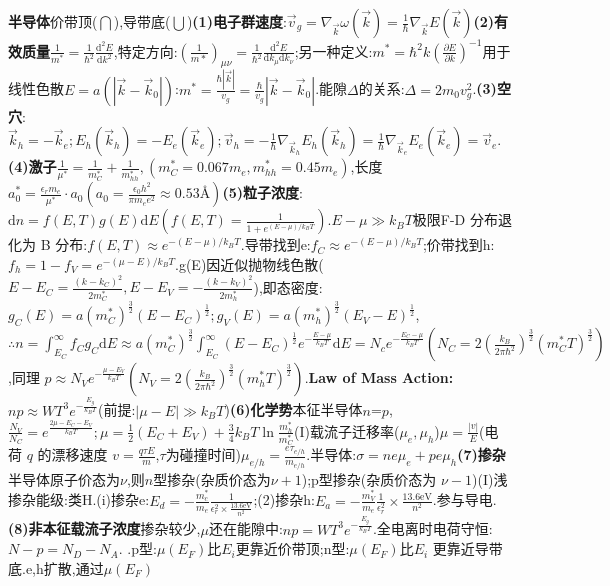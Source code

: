 \documentclass[UTF8,a4paper,10pt,twocolumn]{ctexart}
\begin{document}
   \textbf{半导体}价带顶($\bigcap$),导带底($\bigcup$)\textbf{(1)电子群速度}:$\vec{v}_{g} = \nabla_{\vec{k}}\omega(\vec{k})= \frac{1}{\hbar}\nabla_{\vec{k}}E(\vec{k})$\textbf{(2)有效质量}$\frac{1}{m^{*}} = \frac{1}{\hbar^{2}}\frac{\mathrm{d}^2 E}{\mathrm{d}k^2}$,特定方向:$\left(\frac{1}{m{*}}\right)_{\mu\nu}=\frac{1}{\hbar^{2}}\frac{\mathrm{d}^{2}E}{\mathrm{d}k_{\mu}\mathrm{d}k_{\nu}}$;另一种定义:$m^{*} = \hbar^{2}k\left(\frac{\partial E}{\partial k}\right)^{-1}$用于线性色散$E = a(|\vec{k}-\vec{k}_{0}|)$:$m^{*} = \frac{\hbar|\vec{k}|}{v_{g}} = \frac{\hbar}{v_{g}}|\vec{k}-\vec{k}_{0}|$.能隙$\Delta$的关系:$\Delta = 2m_{0}v_{g}^{2}$.\textbf{(3)空穴}:$\vec{k}_{h} = -\vec{k}_{e};E_{h}(\vec{k}_{h}) = - E_{e}(\vec{k}_{e});\vec{v}_{h} = -\frac{1}{\hbar}\nabla_{\vec{k}_{h}}E_{h}(\vec{k}_{h}) = \frac{1}{\hbar}\nabla_{\vec{k}_{e}}E_{e}(\vec{k}_{e}) = \vec{v}_{e}$.\textbf{(4)激子}$\frac{1}{\mu^{*}} = \frac{1}{m_{C}^{*}} + \frac{1}{m_{hh}^{*}},(m_{C}^{*} = 0.067m_{e},  m_{hh}^{*} = 0.45m_{e})$,长度$a_{0}^{*} = \frac{\epsilon_{r}m_{e}}{\mu^{*}}\cdot a_{0}(a_{0} = \frac{\epsilon_{0}h^{2}}{\pi m_{e}e^{2}} \approx 0.53\text{Å})$\textbf{(5)粒子浓度}:$\mathrm{d}n = f(E, T)g(E)\mathrm{d}E(f(E,T) = \frac{1}{1+e^{(E-\mu)/k_{B}T}})$.$E - \mu\gg k_{B}T$极限F-D 分布退化为 B 分布:$f(E, T) \approx e^{-(E-\mu)/k_{B}T}$.导带找到e:$f_{C}\approx e^{-(E-\mu)/k_{B}T}$;价带找到h:$f_{h} = 1 - f_{V}=e^{-(\mu-E)/k_{B}T}$.g(E)因近似抛物线色散($E - E_{C} = \frac{(k-k_{C})^{2}}{2m_{C}^{*}},E - E_{V} =-\frac{(k-k_{V})^{2}}{2m_{h}^{*}}$),即态密度:$g_{C}(E) = a(m_{C}^{*})^{\frac{3}{2}}(E - E_{C})^{\frac{1}{2}};g_{V}(E) = a(m_{h}^{*})^{\frac{3}{2}}(E_{V} - E)^{\frac{1}{2}}$,$\therefore n = \int_{E_{C}}^{\infty}f_{C}g_{C}\mathrm{d}E\approx a(m_{C}^{*})^{\frac{3}{2}}\int_{E_{C}}^{\infty}(E-E_{C})^{\frac{1}{2}}e^{-\frac{E-\mu}{k_{B}T}}\mathrm{d}E= N_{c} e^{-\frac{E_{C}-\mu}{k_{B}T}}(N_{C} = 2(\frac{k_{B}}{2\pi\hbar^{2}})^{\frac{3}{2}}(m_{C}^{*}T)^{\frac{3}{2}})$,同理 $p \approx N_{V}e^{-\frac{\mu - E_{V}}{k_{B}T}}(N_{V} = 2(\frac{k_{B}}{2\pi\hbar^{2}})^{\frac{3}{2}}(m_{h}^{*}T)^{\frac{3}{2}})$.\textbf{Law of Mass Action:}$np\approx WT^{3}e^{-\frac{E_{g}}{k_{B}T}}$(前提:$|\mu - E|\gg k_{B}T$)\textbf{(6)化学势}本征半导体$n$=$p$, $\frac{N_{V}}{N_{C}} = e^{\frac{2\mu-E_{C}-E_{V}}{k_{B}T}};\mu = \frac{1}{2}(E_{C}+ E_{V}) + \frac{3}{4}k_{B}T\ln{\frac{m_{h}^{*}}{m_{C}^{*}}}$(I)载流子迁移率($\mu_{e}, \mu_{h}$)$\mu = \frac{|v|}{E}$(电荷 $q$ 的漂移速度 $v =\frac{q\tau E}{m}$,$\tau$为碰撞时间)$\mu_{e/h} = \frac{e\tau_{e/h}}{m_{e/h}}$.半导体:$\sigma = ne\mu_e + pe\mu_h$\textbf{(7)掺杂}半导体原子价态为$\nu$,则$n$型掺杂(杂质价态为$\nu+1$);p型掺杂(杂质价态为 $\nu-1$)(I)浅掺杂能级:类H.(i)掺杂e:$E_{d}=-\frac{m_{c}^{*}}{m_{e}}\frac{1}{\epsilon_{r}^{2}\times\frac{13.6\text{eV}}{n^{2}}}$;(2)掺杂h:$E_{a}=-\frac{m_{V}^{*}}{m_{e}}\frac{1}{\epsilon_{r}^{2}}\times\frac{13.6\text{eV}}{n^{2}}$.参与导电.\textbf{(8)非本征载流子浓度}掺杂较少,$\mu$还在能隙中:$np=WT^{3}e^{-\frac{E_{g}}{k_{B}T}}$.全电离时电荷守恒:$N-p=N_{D}-N_{A}$. .p型:$\mu(E_{F})$比$E_{i}$更靠近价带顶;n型:$\mu(E_{F})$比$E_{i}$ 更靠近导带底.e,h扩散,通过$\mu(E_{F})$ 
\end{document}
